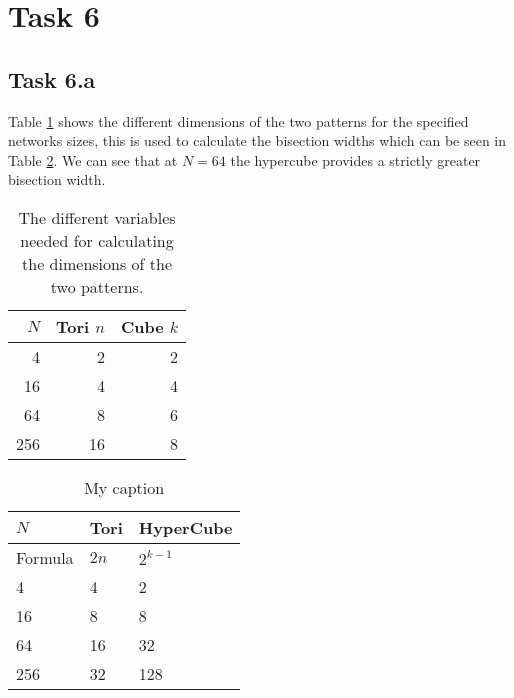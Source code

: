 \section{Task 6}

\subsection{Task 6.a}

Table \ref{tab:task6a1} shows the different dimensions of the two patterns for
the specified networks sizes, this is used to calculate the bisection widths
which can be seen in Table \ref{tab:task6a2}. We can see that at $N=64$ the
hypercube provides a strictly greater bisection width.

\begin{table}[H]
    \centering
    \begin{tabular}{|r|r|r|}
        \hline
        $N$ & Tori $n$ & Cube $k$ \\\hline
          4 &  2       & 2        \\
         16 &  4       & 4        \\
         64 &  8       & 6        \\
        256 & 16       & 8        \\\hline
    \end{tabular}
    \caption{The different variables needed for calculating the dimensions of
        the two patterns.}
    \label{tab:task6a1}
\end{table}

\begin{table}[H]
    \centering
    \begin{tabular}{|l|l|l|}
        \hline
        $N$     & Tori & HyperCube \\ \hline
        Formula & $2n$ & $2^{k-1}$ \\
        4       &  4   &   2       \\
        16      &  8   &   8       \\
        64      & 16   &  32       \\
        256     & 32   & 128       \\ \hline
    \end{tabular}
    \caption{My caption}
    \label{tab:task6a2}
\end{table}


